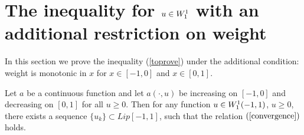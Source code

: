 \section{The inequality for $u \in W_1^1$ with an additional restriction on weight}
\label{ASC}

In this section we prove the inequality (\ref{toprove}) under the additional condition:
weight is monotonic in $x$ for $x \in [-1, 0]$ and $x \in [0, 1]$.

\begin{lm}
\label{Wapprox}
Let $a$ be a continuous function
and let $a(\cdot, u)$ be increasing on $[-1, 0]$ and decreasing on $[0, 1]$ for all $u \ge 0$.
Then for any function $u \in W_1^1(-1, 1)$, $u \ge 0$,
there exists a sequence $\{u_k\} \subset Lip[-1, 1]$, such that the relation $(\ref{convergence})$ holds.
\end{lm}

